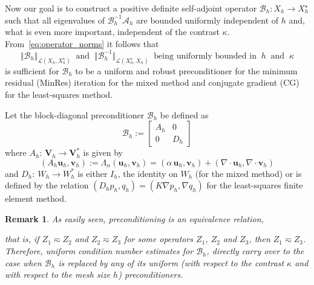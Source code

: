 \documentclass[11pt]{amsart}
\numberwithin{equation}{section}
\newtheorem{remark}{Remark}[section]
\theoremstyle{definition}\newtheorem{example}{Example}[section]
\begin{document}
Now our goal is to construct a positive definite self-adjoint operator 
$\mathcal{B}_h:X_h\rightarrow X_h^{\star}$ such that all eigenvalues of 
$\mathcal{B}_h^{-1}\mathcal{A}_h$ are bounded 
uniformly independent of $h$ and, what is even more important, independent of the 
contrast $\kappa$. From~\eqref{eq:operator_norms} it follows that 
\begin{equation}\label{eq:precond_norms}
 \Vert\mathcal{B}_h\Vert_{\mathcal{L}(X_h,X_h^{\star})}\;\; \mbox{and}\;\; 
\Vert\mathcal{B}_h^{-1}\Vert_{\mathcal{L}(X_h^{\star},X_h)} \;\; \mbox{being uniformly bounded in} \;\; h \;\; \mbox{and} 
\;\; \kappa
\end{equation}
is sufficient for $\mathcal{B}_h$ to be a uniform and robust
preconditioner for the minimum residual (MinRes) iteration for the
mixed method and conjugate gradient (CG) for the least-squares
method. 

Let the block-diagonal preconditioner $\mathcal{B}_h$ be defined as
\begin{equation}\label{eq:AFW_preconditioner}
 \mathcal{B}_h:=\left[
\begin{array}{cc}
 A_h & 0\\[2ex]
 0 & D_h
\end{array}
\right]
\end{equation}
where $A_h:\,{{\boldsymbol V}}_h\rightarrow {{\boldsymbol V}}_h^{*}$ is given by
$$
(A_h{{\mathbf u}}_h,{{\mathbf v}}_h):=\Lambda_{{\alpha}}({{\mathbf u}}_h,{{\mathbf v}}_h)=
({{\alpha}} \, {{\mathbf u}}_h,{{\mathbf v}}_h)+(\nabla\cdot {{\mathbf u}}_h,\nabla\cdot {{\mathbf v}}_h)
$$
and $D_h: ~W_h \to W_h^*$ is either $I_h$, the identity on $W_h$ (for the mixed method) or
is defined by the relation $(D_h p_h, q_h)=(K \nabla p_h, \nabla q_h)$ for the least-squares
finite element method. 

\begin{remark}\label{iterations}
As easily seen, preconditioning is an equivalence relation,
  
  that is, if
  $Z_1\eqsim Z_2$ and $Z_2\eqsim Z_3$ for some operators $Z_1$,
  $Z_2$ and $Z_3$, then $Z_1\eqsim Z_3$. Therefore, uniform condition
  number estimates for $\mathcal{B}_h$, directly carry over to the
  case when $\mathcal{B}_h$ is replaced by any of its uniform (with
  respect to the contrast $\kappa$ and with respect to the mesh size $h$) preconditioners.  
\end{remark}
\end{document}
